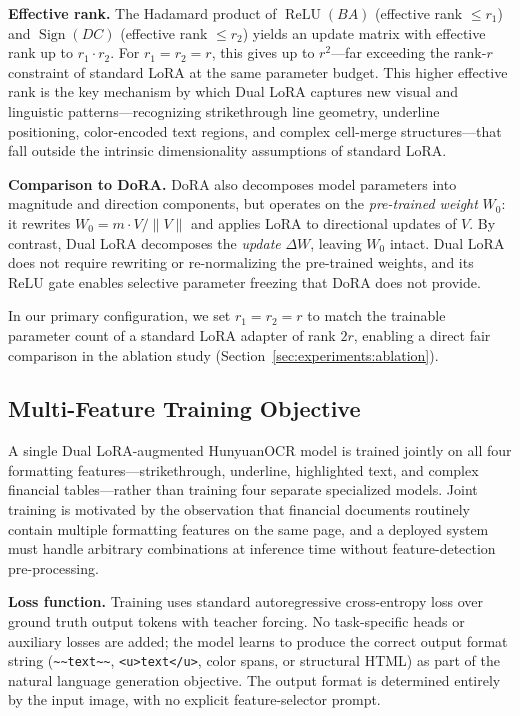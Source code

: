 \documentclass[10pt,twocolumn]{article}
\begin{document}
\textbf{Effective rank.} The Hadamard product of $\operatorname{ReLU}(BA)$
(effective rank $\leq r_1$) and $\operatorname{Sign}(DC)$ (effective rank
$\leq r_2$) yields an update matrix with effective rank up to $r_1 \cdot r_2$.
For $r_1 = r_2 = r$, this gives up to $r^2$---far exceeding the rank-$r$
constraint of standard LoRA at the same parameter budget. This higher effective
rank is the key mechanism by which Dual LoRA captures new visual and linguistic
patterns---recognizing strikethrough line geometry, underline positioning,
color-encoded text regions, and complex cell-merge structures---that fall outside
the intrinsic dimensionality assumptions of standard LoRA.

\textbf{Comparison to DoRA.} DoRA \cite{liu2024dora} also decomposes model
parameters into magnitude and direction components, but operates on the
\textit{pre-trained weight} $W_0$: it rewrites $W_0 = m \cdot V / \|V\|$ and
applies LoRA to directional updates of $V$. By contrast, Dual LoRA decomposes
the \textit{update} $\Delta W$, leaving $W_0$ intact. Dual LoRA does not require
rewriting or re-normalizing the pre-trained weights, and its ReLU gate enables
selective parameter freezing that DoRA does not provide.

In our primary configuration, we set $r_1 = r_2 = r$ to match the trainable
parameter count of a standard LoRA adapter of rank $2r$, enabling a direct fair
comparison in the ablation study (Section~\ref{sec:experiments:ablation}).

\subsection{Multi-Feature Training Objective}
\label{sec:method:training}

A single Dual LoRA-augmented HunyuanOCR model is trained jointly on all four
formatting features---strikethrough, underline, highlighted text, and complex
financial tables---rather than training four separate specialized models. Joint
training is motivated by the observation that financial documents routinely
contain multiple formatting features on the same page, and a deployed system must
handle arbitrary combinations at inference time without feature-detection
pre-processing.

\textbf{Loss function.} Training uses standard autoregressive cross-entropy loss
over ground truth output tokens with teacher forcing. No task-specific heads or
auxiliary losses are added; the model learns to produce the correct output format
string (\texttt{\textasciitilde\textasciitilde{}text\textasciitilde\textasciitilde},
\texttt{<u>text</u>}, color spans, or structural HTML) as part of the natural
language generation objective. The output format is determined entirely by the
input image, with no explicit feature-selector prompt.
\end{document}
